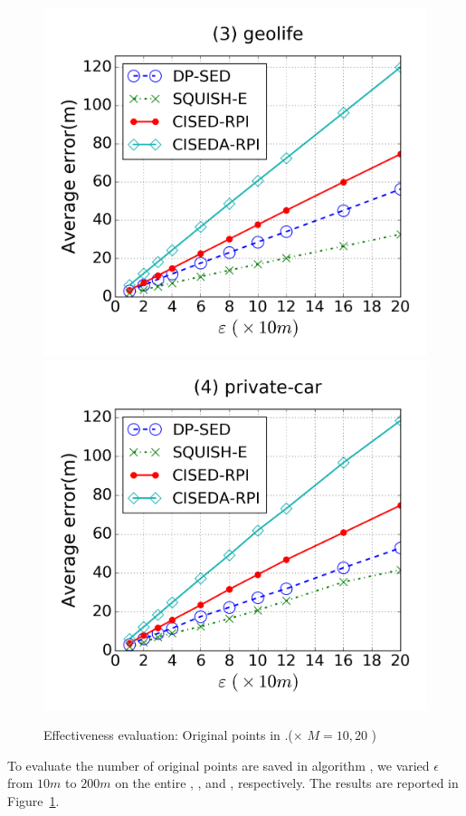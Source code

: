 {\begin{figure}[tb]
\includegraphics[scale = 0.250]{figures/Exp-error-epsilon-geolife.png}
\includegraphics[scale = 0.250]{figures/Exp-error-epsilon-private.png}
\vspace{-3ex}
\caption{\small Effectiveness evaluation: Original points in \cista.(\cista  $\times$ $M = 10, {20}$ )}
\label{fig:orig-points}
\vspace{-1ex}
\end{figure}

To evaluate the number of original points are saved in algorithm \cista, we varied $\epsilon$ from $10m$ to $200m$ on the entire \truck, \sercar, \geolife and \pricar, respectively.
The results are reported in Figure~\ref{fig:orig-points}.
}





